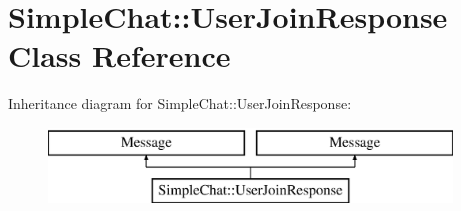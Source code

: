 \hypertarget{classSimpleChat_1_1UserJoinResponse}{\section{Simple\-Chat\-:\-:User\-Join\-Response Class Reference}
\label{classSimpleChat_1_1UserJoinResponse}
}
Inheritance diagram for Simple\-Chat\-:\-:User\-Join\-Response\-:\begin{figure}[H]
\begin{center}
\leavevmode
\includegraphics[height=2.000000cm]{classSimpleChat_1_1UserJoinResponse}
\end{center}
\end{figure}
